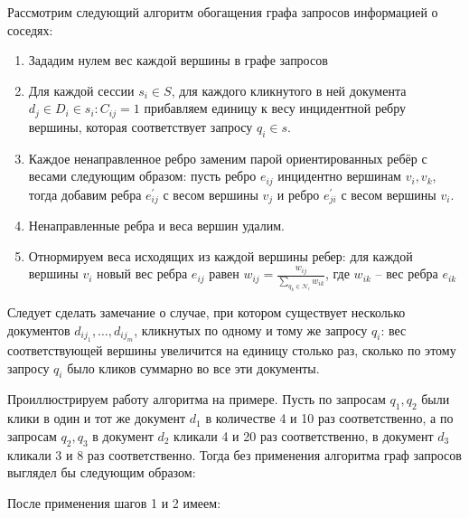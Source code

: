 \documentclass[diploma]{nanolab2015}
\begin{document}
Рассмотрим следующий алгоритм обогащения графа запросов информацией о соседях:
\begin{enumerate}
    [
    leftmargin=*,
    label={Шаг \arabic*.}
    ]
    \item Зададим нулем вес каждой вершины в графе запросов
    \item Для каждой сессии $s_i \in S$, для каждого кликнутого в ней документа $d_j \in D_i \in s_i : C_{ij} = 1$ прибавляем единицу к весу инцидентной ребру вершины, которая соответствует запросу $q_i \in s$.
    \item Каждое ненаправленное ребро заменим парой ориентированных ребёр с весами следующим образом: пусть ребро $e_{ij}$ инцидентно вершинам $v_i, v_k$, тогда добавим ребра $e_{ij}^{'}$ с весом вершины $v_j$ и ребро $e_{ji}^{'}$ с весом вершины $v_i$.
    \item Ненаправленные ребра и веса вершин удалим.
    \item Отнормируем веса исходящих из каждой вершины ребер: для каждой вершины $v_i$ новый вес ребра $e_{ij}$ равен $ w_{ij} = \frac{w_{ij}}{\sum_{q_k \in \mathcal{N}_i} w_{ik} }$, где $w_{ik}$ -- вес ребра $e_{ik}$
\end{enumerate}

Следует сделать замечание о случае, при котором существует несколько документов $d_{ij_{1}}, \dots , d_{ij_{m}}$, кликнутых по одному и тому же запросу $q_i$: вес соответствующей вершины увеличится на единицу столько раз, сколько по этому запросу $q_i$ было кликов суммарно во все эти документы.

Проиллюстрируем работу алгоритма на примере. Пусть по запросам $q_1, q_2$ были клики в один и тот же документ $d_1$ в количестве 4 и 10 раз соответственно, а по запросам $q_2, q_3$ в документ $d_2$ кликали 4 и 20 раз соответственно, в документ $d_3$ кликали 3 и 8 раз соответственно. Тогда без применения алгоритма граф запросов выглядел бы следующим образом: 
\begin{center}
\end{center}

После применения шагов 1 и 2 имеем:
\end{document}
